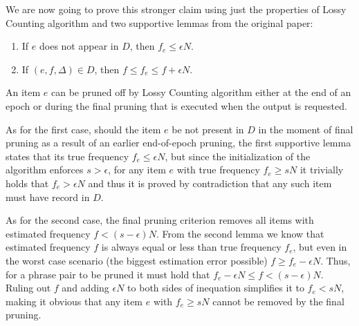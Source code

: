We are now going to prove this stronger claim using just the properties of Lossy Counting
algorithm and two supportive lemmas from the original paper:
\begin{enumerate}
  \item If $e$ does not appear in $D$, then $f_{e} \leq \epsilon N$.
  \item If $(e,f,\Delta) \in D$, then $f \leq f_{e} \leq f + \epsilon N$.
\end{enumerate}

An item $e$ can be pruned off by Lossy Counting algorithm either at the end of an epoch or
during the final pruning that is executed when the output is requested.

As for the first case, should the item $e$ be not present in $D$ in the moment of final
pruning as a result of an earlier end-of-epoch pruning, the first supportive lemma states
that its true frequency $f_e \leq \epsilon N$, but since the initialization of the algorithm
enforces $s > \epsilon$, for any item $e$ with true frequency $f_{e} \geq sN$ it trivially
holds that $f_{e} > \epsilon N$ and thus it is proved by contradiction that any such item
must have record in $D$.

As for the second case, the final pruning criterion removes all items with estimated frequency
$f < (s - \epsilon)N$. From the second lemma we know that estimated frequency $f$ is always
equal or less than true frequency $f_{e}$, but even in the worst case scenario (the biggest
estimation error possible) $f \geq f_{e} - \epsilon N$.
Thus, for a phrase pair to be pruned it must hold that $f_{e} - \epsilon N \leq f < (s - \epsilon) N$.
Ruling out $f$ and adding $\epsilon N$ to both sides of inequation simplifies it to $f_{e} < sN$,
making it obvious that any item $e$ with $f_{e} \geq sN$ cannot be removed by the final pruning.
